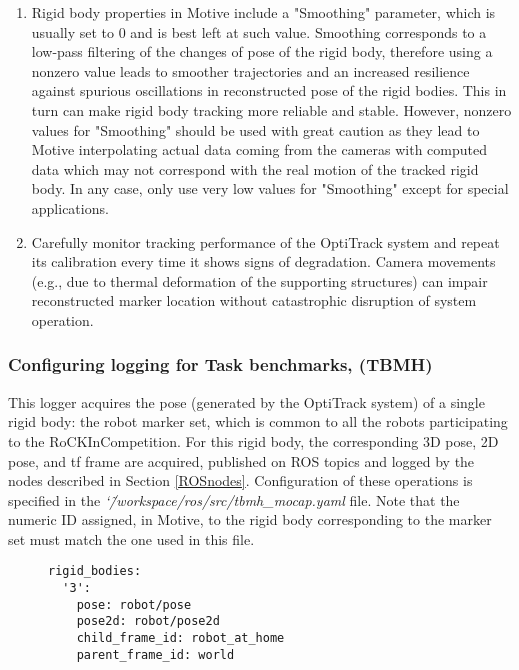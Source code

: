 \documentclass[a4paper]{article}
\newcommand{\ro}{RoCKIn}
\newcommand{\srcdir}{\char`\~/workspace/ros/src/}
\begin{document}
\begin{enumerate}
\item Rigid body properties in Motive include a "Smoothing" parameter, which is usually set to 0 and is best left at such value. Smoothing corresponds to a low-pass filtering of the changes of pose of the rigid body, therefore using a nonzero value leads to smoother trajectories and an increased resilience against spurious oscillations in reconstructed pose of the rigid bodies. This in turn can make rigid body tracking more reliable and stable. However, nonzero values for "Smoothing" should be used with great caution as they lead to Motive interpolating actual data coming from the cameras with computed data which may not correspond with the real motion of the tracked rigid body. In any case, only use very low values for "Smoothing" except for special applications.
\item Carefully monitor tracking performance of the OptiTrack system and repeat its calibration every time it shows signs of degradation. Camera movements (e.g., due to thermal deformation of the supporting structures) can impair reconstructed marker location without catastrophic disruption of system operation.
\end{enumerate}

\clearpage

\subsubsection{Configuring logging for Task benchmarks, \ro@Home (TBMH)}
This logger acquires the pose (generated by the OptiTrack system) of a single rigid body: the robot marker set, which is common to all the robots participating to the \ro Competition. For this rigid body, the corresponding 3D pose, 2D pose, and tf frame are acquired, published on ROS topics and logged by the nodes described in Section \ref{ROSnodes}. 
Configuration of these operations is specified in the \emph{\srcdir tbmh\_mocap.yaml} file. Note that the numeric ID assigned, in Motive, to the rigid body corresponding to the marker set must match the one used in this file.

\begin{figure}[h!]
	\noindent
	\begin{minipage}[t!]{\linewidth}
		\begin{lstlisting}[caption=tbmh\_mocap.yaml]
rigid_bodies:
  '3':
    pose: robot/pose
    pose2d: robot/pose2d
    child_frame_id: robot_at_home
    parent_frame_id: world
		\end{lstlisting}
	\end{minipage}
\end{figure}
\end{document}
